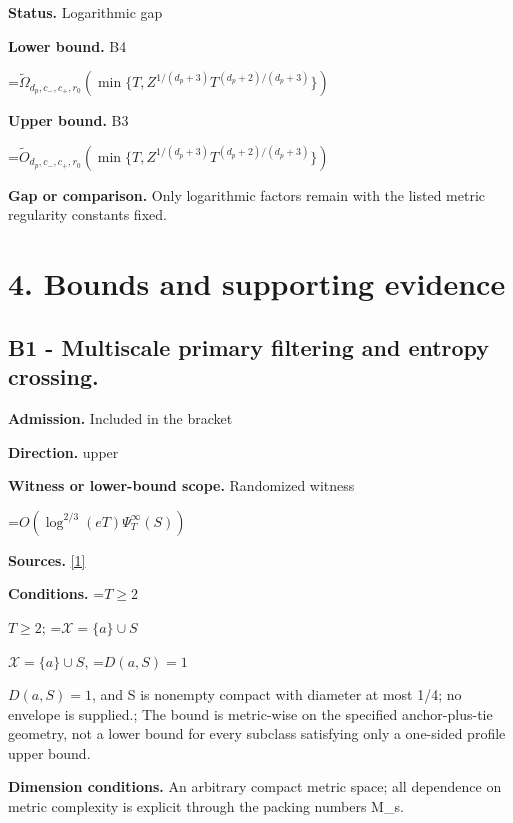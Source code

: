 \documentclass[10pt,a4paper]{article}
\newcommand{\AtlasMath}[1]{\par\begingroup\centering\setbox0=\hbox{$\displaystyle #1$}\ifdim\wd0>1.4\linewidth\typeout{ATLAS WIDE FORMULA: \the\wd0}\fi\ifdim\wd0>\linewidth\resizebox{\linewidth}{!}{\box0}\else\box0\fi\par\endgroup}
\newcommand{\AtlasInlineMath}[1]{\begingroup\setbox0=\hbox{$#1$}\ifdim\wd0>.4\linewidth\endgroup\AtlasMath{#1}\else\endgroup$#1$\fi}
\begin{document}
\textbf{Status.} Logarithmic gap



\textbf{Lower bound.} B4



\AtlasMath{\widetilde\Omega_{d_p,c_-,c_+,r_0}(\min\{T,Z^{1/(d_p+3)}T^{(d_p+2)/(d_p+3)}\})}


\textbf{Upper bound.} B3



\AtlasMath{\widetilde O_{d_p,c_-,c_+,r_0}(\min\{T,Z^{1/(d_p+3)}T^{(d_p+2)/(d_p+3)}\})}


\textbf{Gap or comparison.} Only logarithmic factors remain with the listed metric regularity constants fixed.



\section{4. Bounds and supporting evidence}


\subsection{B1 - Multiscale primary filtering and entropy crossing.}


\textbf{Admission.} Included in the bracket



\textbf{Direction.} upper



\textbf{Witness or lower-bound scope.} Randomized witness



\AtlasMath{O(\log^{2/3}(eT)\Psi_T^\infty(S))}


\textbf{Sources.} \href{https://github.com/WU-Wendao/Colombo/blob/main/colombo_sensorium/Complexity_altas/data/sources/colombo/U07/manuscript.pdf}{[1]}



\textbf{Conditions.} \AtlasInlineMath{T\ge2}; \AtlasInlineMath{\mathcal X=\{a\}\cup S}, \AtlasInlineMath{D(a,S)=1}, and S is nonempty compact with diameter at most 1/4; no envelope is supplied.; The bound is metric-wise on the specified anchor-plus-tie geometry, not a lower bound for every subclass satisfying only a one-sided profile upper bound.



\textbf{Dimension conditions.} An arbitrary compact metric space; all dependence on metric complexity is explicit through the packing numbers M\_s.
\end{document}
